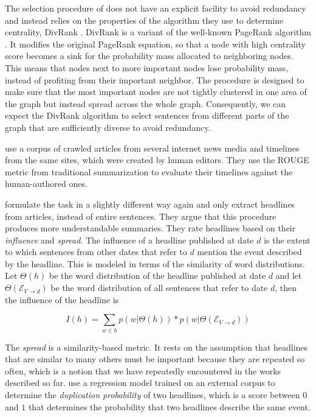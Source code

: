\documentclass[a4paper,BCOR=10mm]{report}
\numberwithin{lemma}{chapter}
\numberwithin{definition}{chapter}
\begin{document}
The selection procedure of \citet{yan-trans} does not have an explicit facility to avoid redundancy and instead relies on the properties of the algorithm they use to determine centrality, DivRank \citep{divrank}. DivRank is a variant of the well-known PageRank algorithm \citep{pagerank}. It modifies the original PageRank equation, so that a node with high centrality score becomes a sink for the probability mass allocated to neighboring nodes. This means that nodes next to more important nodes lose probability mass, instead of profiting from their important neighbor. The procedure is designed to make sure that the most important nodes are not tightly clustered in one area of the graph but instead spread across the whole graph. Consequently, we can expect the DivRank algorithm to select sentences from different parts of the graph that are sufficiently diverse to avoid redundancy.

\citet{yan-trans} use a corpus of crawled articles from several internet news media and timelines from the same sites, which were created by human editors.
They use the ROUGE \citep{rouge} metric from traditional summarization to evaluate their timelines against the human-authored ones.

\citet{tran-headlines} formulate the task in a slightly different way again and only extract headlines from articles, instead of entire sentences. They argue that this procedure produces more understandable summaries.
They rate headlines based on their \textit{influence} and \textit{spread}.
The influence of a headline published at date $d$ is the extent to which sentences from other dates that refer to $d$ mention the event described by the headline.
This is modeled in terms of the similarity of word distributions. Let $\Theta(h)$ be the word distribution of the headline published at date $d$ and let $\Theta(\mathcal{E}_{V \rightarrow d})$ be the word distribution of all sentences that refer to date $d$, then the influence of the headline is

\begin{equation}
I(h) = \sum_{w \in h} p(w|\Theta(h)) * p(w|\Theta(\mathcal{E}_{V \rightarrow d}))
\end{equation}

The \textit{spread} is a similarity-based metric. It rests on the assumption that headlines that are similar to many others must be important because they are repeated so often, which is a notion that we have repeatedly encountered in the works described so far.
\citeauthor{tran-headlines} use a regression model trained on an external corpus to determine the \textit{duplication probability} of two headlines, which is a score between $0$ and $1$ that determines the probability that two headlines describe the same event.
\end{document}
